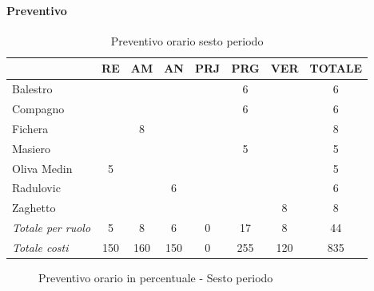 \documentclass[a4paper,12pt]{article}
\begin{document}
            \paragraph{Preventivo}
                \begin{table}[H]
                \centering
                \begin{tabular}{|l|c|c|c|c|c|c|c|}
                \hline
                    \rowcolor{lightgray}{\textbf{Membro}} & {\textbf{RE}} & {\textbf{AM}} & {\textbf{AN}} & {\textbf{PRJ}} & {\textbf{PRG}} & {\textbf{VER}} & {\textbf{TOTALE}}\\
                \hline
                    Balestro & & & & & 6 & & 6\\
                \hline
                    Compagno & & & & & 6 & & 6\\
                \hline
                    Fichera & & 8 & & & & & 8\\
                \hline
                    Masiero & & & & & 5 & & 5\\
                \hline
                    Oliva Medin & 5 & & & & & & 5\\
                \hline
                    Radulovic & & & 6 & & & & 6\\
                \hline
                    Zaghetto & & & & & & 8 & 8\\
                \hline
                    \rowcolor{lightgray}\textit{Totale per ruolo} & 5 & 8 & 6 & 0 & 17 & 8 & 44\\
                \hline
                    \rowcolor{lightgray}\textit{Totale costi} & 150 & 160 & 150 & 0 & 255 & 120 & 835\\
                \hline
                \end{tabular}
                \caption{Preventivo orario sesto periodo}
                \end{table}

                \begin{figure}[H]
                \centering
                \caption{Preventivo orario in percentuale - Sesto periodo}
                \end{figure}
                
\end{document}
